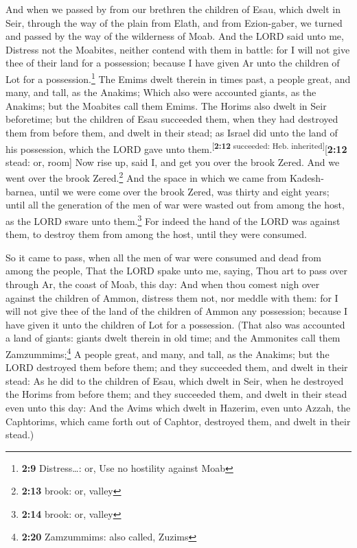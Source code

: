  And when we passed by from our brethren the children of
Esau, which dwelt in Seir, through the way of the plain from Elath, and
from Ezion-gaber, we turned and passed by the way of the wilderness of
Moab.  And the LORD said unto me, Distress not the
Moabites, neither contend with them in battle: for I will not give thee
of their land for a possession; because I have given Ar unto the
children of Lot for a possession.\footnote{\textbf{2:9} Distress\ldots:
  or, Use no hostility against Moab}  The Emims dwelt
therein in times past, a people great, and many, and tall, as the
Anakims;  Which also were accounted giants, as the
Anakims; but the Moabites call them Emims.  The Horims
also dwelt in Seir beforetime; but the children of Esau succeeded them,
when they had destroyed them from before them, and dwelt in their stead;
as Israel did unto the land of his possession, which the LORD gave unto
them.\textsuperscript{{[}\textbf{2:12} succeeded: Heb.
inherited{]}}{[}\textbf{2:12} stead: or, room{]}  Now
rise up, said I, and get you over the brook Zered. And we went over the
brook Zered.\footnote{\textbf{2:13} brook: or, valley} 
And the space in which we came from Kadesh-barnea, until we were come
over the brook Zered, was thirty and eight years; until all the
generation of the men of war were wasted out from among the host, as the
LORD sware unto them.\footnote{\textbf{2:14} brook: or, valley}
 For indeed the hand of the LORD was against them, to
destroy them from among the host, until they were consumed.

 So it came to pass, when all the men of war were
consumed and dead from among the people,  That the LORD
spake unto me, saying,  Thou art to pass over through Ar,
the coast of Moab, this day:  And when thou comest nigh
over against the children of Ammon, distress them not, nor meddle with
them: for I will not give thee of the land of the children of Ammon any
possession; because I have given it unto the children of Lot for a
possession.  (That also was accounted a land of giants:
giants dwelt therein in old time; and the Ammonites call them
Zamzummims;\footnote{\textbf{2:20} Zamzummims: also called, Zuzims}
 A people great, and many, and tall, as the Anakims; but
the LORD destroyed them before them; and they succeeded them, and dwelt
in their stead:  As he did to the children of Esau, which
dwelt in Seir, when he destroyed the Horims from before them; and they
succeeded them, and dwelt in their stead even unto this day:
 And the Avims which dwelt in Hazerim, even unto Azzah,
the Caphtorims, which came forth out of Caphtor, destroyed them, and
dwelt in their stead.)

